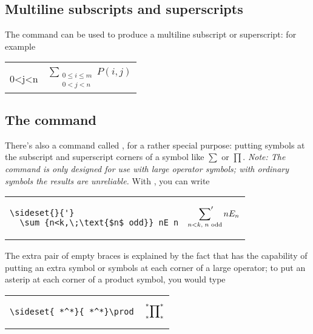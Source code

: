 \subsection{Multiline subscripts and superscripts}

The  command can be used to produce a multiline subscript
or superscript:\relax
{} for example
\begin{center}
\begin{tabular}{ll}
\begin{minipage}[t]{.6\columnwidth}
\begin{verbatim}
\sum_{\substack{
         0\le i\le m\\
         0<j<n}}
  P(i,j)
\end{verbatim}
\end{minipage}
&
$\displaystyle
\sum_{\substack{0\le i\le m\\ 0<j<n}} P(i,j)$
\end{tabular}
\end{center}

\subsection{The  command}\label{sideset}

There's also a command called , for a rather special
purpose: putting symbols at the subscript and
superscript corners of a
symbol like $\sum$ or $\prod$. \emph{Note: The
   command is only designed for use with large operator
  symbols; with ordinary symbols the results are unreliable.}
With , you can write
\begin{center}
\begin{tabular}{ll}
\begin{minipage}[t]{.6\columnwidth}
\begin{verbatim}
\sideset{}{'}
  \sum_{n<k,\;\text{$n$ odd}} nE_n
\end{verbatim}
\end{minipage}
&$\displaystyle
\sideset{}{'}\sum_{n<k,\;\text{$n$ odd}} nE_n
$
\end{tabular}
\end{center}
The extra pair of empty braces is explained by the fact that
 has the capability of putting an extra symbol or symbols at
each corner of a large operator; to put an asterip at each corner of a
product symbol, you would type
\begin{center}
\begin{tabular}{ll}
\begin{minipage}[t]{.6\columnwidth}
\begin{verbatim}
\sideset{_*^*}{_*^*}\prod
\end{verbatim}
\end{minipage}
&$\displaystyle
\sideset{_*^*}{_*^*}\prod
$
\end{tabular}
\end{center}

